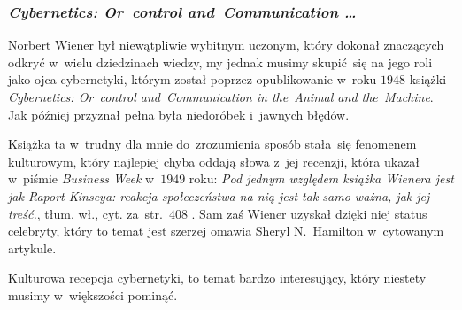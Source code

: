 \documentclass[10pt,t]{beamer}
\begin{document}
\begin{frame}
  \frametitle{\textit{Cybernetics: Or~control and~Communication \ldots}}


  Norbert Wiener był niewątpliwie wybitnym uczonym, który dokonał
  znaczących odkryć w~wielu dziedzinach wiedzy, my jednak musimy
  skupić~się na jego roli jako ojca cybernetyki, którym został poprzez
  opublikowanie w~roku $1948$ książki
  {\textit{Cybernetics: Or~control and~Communication in the~Animal and
      the~Machine}}. Jak później przyznał pełna była niedoróbek i~jawnych
  błędów.

  Książka ta w~trudny dla mnie do~zrozumienia sposób stała~się fenomenem
  kulturowym, który najlepiej chyba oddają słowa z~jej recenzji, która
  ukazał w~piśmie \textit{Business Week} w~$1949$ roku: \textit{Pod jednym
    względem książka Wienera jest jak Raport Kinseya: reakcja społeczeństwa
    na nią jest tak samo ważna, jak jej treść.}, tłum. wł., cyt.
  za~str.~$408$
  \parencite{Hamilton-The-Charismatic-Cultural-Life-of-ETC-Pub-2017}. Sam
  zaś Wiener uzyskał dzięki niej status celebryty, który to temat jest
  szerzej omawia Sheryl N.~Hamilton w~cytowanym artykule.

  Kulturowa recepcja cybernetyki, to temat bardzo interesujący, który
  niestety musimy w~większości pominąć.

\end{frame}
\end{document}
